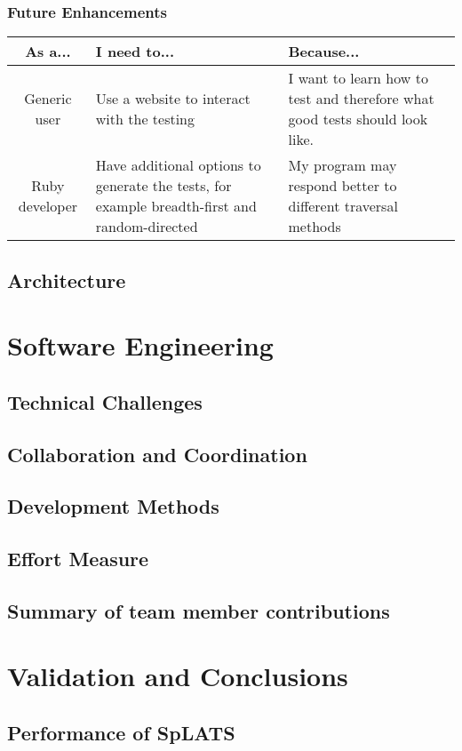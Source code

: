 \documentclass{report}
\begin{document}
\subsection{Future Enhancements}
\begin{tabular}{| c | p{5cm} | p{5cm} |}
\hline
\textbf{As a...} & \textbf{I need to...} & \textbf{Because...} \\
\hline
Generic user & Use a website to interact with the testing & I want to learn how to test and therefore what good tests should look like. \\
\hline
Ruby developer & Have additional options to generate the tests, for example breadth-first and random-directed & My program may respond better to different traversal methods \\
\hline
\end{tabular}
\section{Architecture}


\chapter{Software Engineering}
\section{Technical Challenges}
\section{Collaboration and Coordination}
\section{Development Methods}
\section{Effort Measure}
\section{Summary of team member contributions}

\chapter{Validation and Conclusions}
\section{Performance of SpLATS}
\end{document}
